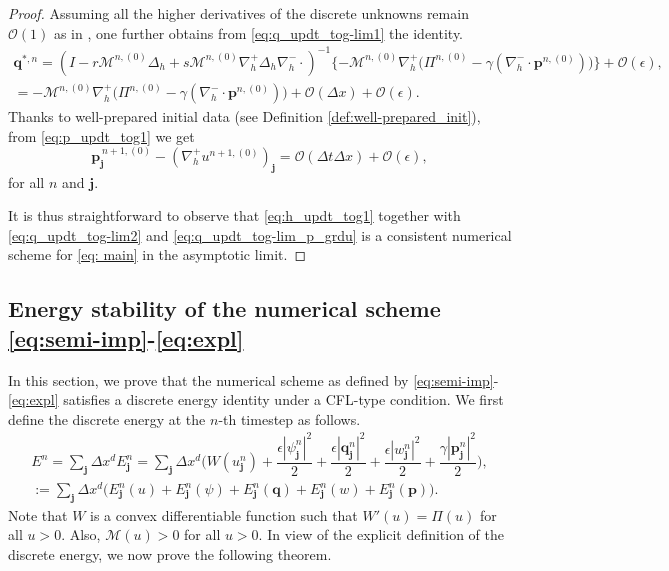 \documentclass[11pt]{article}
\numberwithin{equation}{section}
\newtheorem{counter example}[theorem]{Counter Example}
\numberwithin{equation}{section}
\numberwithin{equation}{section}
\begin{document}
\begin{proof}
Assuming all the higher derivatives of the discrete unknowns remain $\mathcal{O}(1)$ as in \cite{anandan2024high, anandan2025asymptotic}, one further obtains from \eqref{eq:q_updt_tog-lim1} the identity.
\begin{equation}
\begin{aligned}
\label{eq:q_updt_tog-lim2}
\mathbf{q}^{{*},n}=(I-r\mathcal{M}^{n,(0)}\Delta_h+s\mathcal{M}^{n,(0)}\nabla_h^+\Delta_{h}\nabla_h^-\cdot)^{-1}\{ 
-\mathcal{M}^{n,(0)}\nabla_h^+ \big(\Pi^{n,(0)}-\gamma(\nabla_h^- \cdot \mathbf{p}^{n,(0)})\big)\}+\mathcal{O}(\epsilon),\\
=-\mathcal{M}^{n,(0)}\nabla_h^+ \big(\Pi^{n,(0)}-\gamma(\nabla_h^- \cdot \mathbf{p}^{n,(0)})\big) + \mathcal{O}(\Delta x) + \mathcal{O}(\epsilon).
\end{aligned}
\end{equation}
Thanks to well-prepared initial data (see Definition \ref{def:well-prepared_init}), from \eqref{eq:p_updt_tog1} we get
\begin{equation}
\label{eq:q_updt_tog-lim_p_grdu}
    \mathbf{p}_{\mathbf{j}}^{\,n+1,(0)} - (\nabla_h^+ u^{n+1,(0)} )_{\mathbf{j}}= \mathcal{O}(\Delta t\Delta x)+\mathcal{O}(\epsilon),
\end{equation}
for all $n$ and $\mathbf{j}$.

It is thus straightforward to observe that \eqref{eq:h_updt_tog1} together with \eqref{eq:q_updt_tog-lim2} and \eqref{eq:q_updt_tog-lim_p_grdu} is a consistent numerical scheme for \eqref{eq: main} in the asymptotic limit.
\end{proof}

\subsection{Energy stability of the numerical scheme \eqref{eq:semi-imp}-\eqref{eq:expl}}
In this section, we prove that the numerical scheme as defined by \eqref{eq:semi-imp}-\eqref{eq:expl} satisfies a discrete energy identity under a CFL-type condition. We first define the discrete energy at the $n$-th timestep as follows.
\begin{equation}\label{eq:eng_id}
\begin{aligned}
E^n=\sum_{\mathbf{j}}\Delta x^d E^n_{\mathbf{j}}=\sum_{\mathbf{j}}\Delta x^d\bigg(W(u_{\mathbf{j}}^n)+\dfrac{\epsilon{|\psi_{\mathbf{j}}^n|}^2}{2}+\dfrac{\epsilon {|\mathbf{q}_{\mathbf{j}}^n|}^2}{2}+\dfrac{\epsilon {|w_{\mathbf{j}}^n|}^2}{2}+\dfrac{\gamma {|\mathbf{p}_{\mathbf{j}}^n|}^2}{2}\bigg),\\
:=\sum_{\mathbf{j}}\Delta x^d\big(E_{\mathbf{j}}^n(u)+E_{\mathbf{j}}^n(\psi)+E_{\mathbf{j}}^n(\mathbf{q})+E_{\mathbf{j}}^n(w)+E_{\mathbf{j}}^n(\mathbf{p})\big).
\end{aligned}
\end{equation}
Note that $W$ is a convex differentiable function such that $W'(u)=\Pi(u)$ for all $u>0$. Also, $\mathcal{M}(u)>0$ for all $u>0$. In view of the explicit definition of the discrete energy, we now prove the following theorem.
\end{document}
